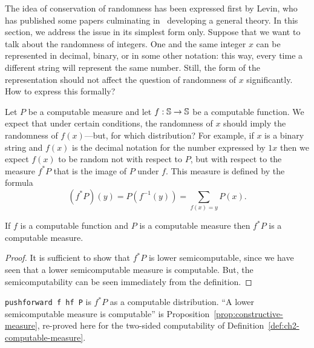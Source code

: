 The idea of conservation of randomness has been expressed first by Levin,
who has published some papers culminating in~\cite{LevinRandCons84}
developing a general theory.
In this section, we address the issue in its simplest form only.
Suppose that we want to talk about the randomness of integers.
One and the same integer $x$
can be represented in decimal, binary, or in some
other notation: this way, every time a different string will represent the
same number.
Still, the form of the representation should not affect the question of
randomness of $x$ significantly.
How to express this formally?

Let $P$ be a computable measure and let $f : \mathbb{S} \to \mathbb{S}$ be a computable
function.
We expect that under certain conditions, the randomness of $x$ should imply
the randomness of $f(x)$---but, for which distribution?
For example, if $x$ is a binary string and $f(x)$ is the decimal notation
for the number expressed by $1x$ then we expect $f(x)$ to be random not
with respect to $P$, but with respect to the measure $f^{*}P$ that is
the image of $P$ under $f$.
This measure is defined by the formula
 \begin{equation}\label{eq:measure-image}
   (f^{*}P)(y) = P(f^{-1}(y)) = \sum_{f(x) = y} P(x).
 \end{equation}

 \begin{proposition}
  \label{prop:g2.2.5}
  \leanok
If $f$ is a computable function and $P$ is a computable measure
then $f^{*}P$ is a computable measure.
 \end{proposition}
 \begin{proof}
  \leanok
It is sufficient to show that $f^{*}P$ is lower semicomputable, since we
have seen that a lower semicomputable measure is computable.
But, the semicomputability can be seen immediately from the definition.
 \end{proof}

\begin{formalization}
\texttt{pushforward f hf P} is \( f^{*}P \) as a computable distribution. ``A lower
semicomputable measure is computable'' is Proposition~\ref{prop:constructive-measure},
re-proved here for the two-sided computability of
Definition~\ref{def:ch2-computable-measure}.
\end{formalization}

